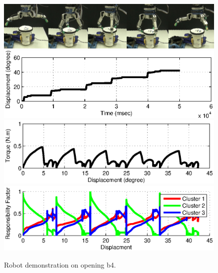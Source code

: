 \begin{figure}
  \centering
  \includegraphics[width=15cm]{./fig_cha4/demo_b4.jpg}
  \includegraphics[width=15cm]{./fig_cha4/demo_b4_s.eps}
  \includegraphics[width=15cm]{./fig_cha4/demo_b4_T.eps}
  \includegraphics[width=15cm]{./fig_cha4/demo_b4_rf.eps}
  \caption{ \scriptsize{Robot demonstration on opening b4.}
}
\label{fig:demo_b4}
\end{figure}

